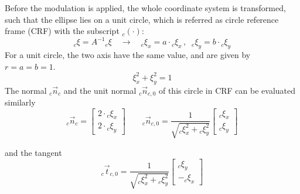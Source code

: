 Before the modulation is applied, the whole coordinate system is transformed, such that the ellipse lies on a unit circle, which is referred as circle reference frame (CRF) with the subscript ${}_c(\cdot)$:
\begin{equation}
  {}_c \xi = A^{-1} {}_e \xi \quad \rightarrow \quad {}_e \xi_x = a \cdot {}_c\xi_x \, , \;\; {}_e \xi_y = b \cdot {}_c\xi_y \label{eq:ellipseCircleTrafo}
\end{equation}
For a unit circle, the two axis have the same value, and are given by $r = a = b = 1$.
\begin{equation}
 \xi_x ^ 2 + \xi_y^2 = 1
\end{equation}
The normal ${}_c \vec n_ {c}$ and the unit normal ${}_c \vec n _{c,0}$ of this circle in CRF can be evaluated similarly
\begin{equation}
  {}_c \vec{n}_c =
  \begin{bmatrix}
    {2 \cdot {}_c \xi_x} \\
    {2 \cdot {}_c \xi_y}
  \end{bmatrix}
  \qquad
  {}_c \vec{n}_{c,0} =
  \frac{1}{\sqrt{ {}_c\xi_x^2 + {}_c \xi_y^2}}
  \begin{bmatrix}
     {}_c\xi_x \\
     {}_c\xi_y
  \end{bmatrix}
\end{equation}

and the tangent
\begin{equation}
  {}_c \vec{t}_{c,0} =
  \frac{1}{\sqrt{ {}_c\xi_x^2 + {}_c \xi_y^2}}
  \begin{bmatrix}
     {}_c\xi_y \\
     - {}_c\xi_x
  \end{bmatrix}
\end{equation}

